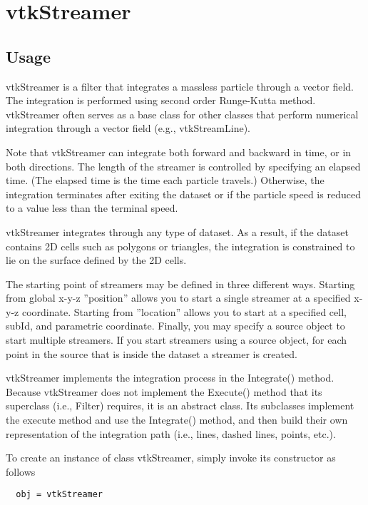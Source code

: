 \section{vtkStreamer}

\subsection{Usage}

 vtkStreamer is a filter that integrates a massless particle through a vector
 field. The integration is performed using second order Runge-Kutta method. 
 vtkStreamer often serves as a base class for other classes that perform 
 numerical integration through a vector field (e.g., vtkStreamLine).

 Note that vtkStreamer can integrate both forward and backward in time,
 or in both directions. The length of the streamer is controlled by 
 specifying an elapsed time. (The elapsed time is the time each particle 
 travels.) Otherwise, the integration terminates after exiting the dataset or
 if the particle speed is reduced to a value less than the terminal speed.

 vtkStreamer integrates through any type of dataset. As a result, if the 
 dataset contains 2D cells such as polygons or triangles, the integration is
 constrained to lie on the surface defined by the 2D cells.

 The starting point of streamers may be defined in three different ways.
 Starting from global x-y-z ''position'' allows you to start a single streamer
 at a specified x-y-z coordinate. Starting from ''location'' allows you to 
 start at a specified cell, subId, and parametric coordinate. Finally, you 
 may specify a source object to start multiple streamers. If you start 
 streamers using a source object, for each point in the source that is 
 inside the dataset a streamer is created.

 vtkStreamer implements the integration process in the Integrate() method.
 Because vtkStreamer does not implement the Execute() method that its 
 superclass (i.e., Filter) requires, it is an abstract class. Its subclasses
 implement the execute method and use the Integrate() method, and then build
 their own representation of the integration path (i.e., lines, dashed 
 lines, points, etc.).

To create an instance of class vtkStreamer, simply
invoke its constructor as follows
\begin{verbatim}
  obj = vtkStreamer
\end{verbatim}
